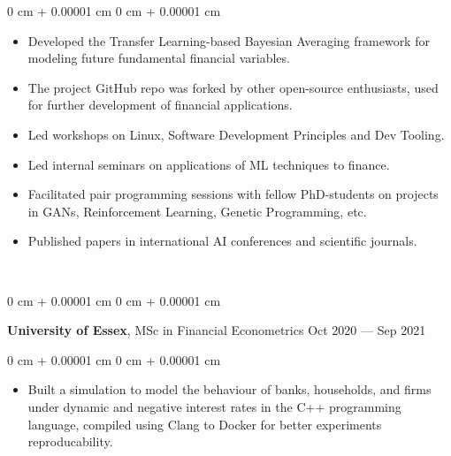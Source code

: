 \documentclass[10pt, letterpaper]{article}
\newenvironment{highlights}{
    \begin{itemize}[
        topsep=0.10 cm,
        parsep=0.10 cm,
        partopsep=0pt,
        itemsep=0pt,
        leftmargin=0 cm + 10pt
    ]
}{
    \end{itemize}
} %
\newenvironment{onecolentry}{
    \begin{adjustwidth}{
        0 cm + 0.00001 cm
    }{
        0 cm + 0.00001 cm
    }
}{
    \end{adjustwidth}
} %
\newenvironment{twocolentry}[2][]{
    \onecolentry
    \def\secondColumn{#2}
    \setcolumnwidth{\fill, 4.5 cm}
    \begin{paracol}{2}
}{
    \switchcolumn \raggedleft \secondColumn
    \end{paracol}
    \endonecolentry
} %
\begin{document}
        \vspace{0.10 cm}
        \begin{onecolentry}
            \begin{highlights}
            \item Developed the Transfer Learning-based Bayesian Averaging framework for modeling future fundamental financial variables.
            \item The project GitHub repo was forked by other open-source enthusiasts, used for further development of financial applications.
                \item Led workshops on Linux, Software Development Principles and Dev Tooling.
                \item Led internal seminars on applications of ML techniques to finance.
                \item Facilitated pair programming sessions with fellow PhD-students on projects in GANs, Reinforcement Learning, Genetic Programming, etc.
                \item Published papers in international AI conferences and scientific journals.
            \end{highlights}
        \end{onecolentry}
        ~
        ~
        \begin{twocolentry}{
            Oct 2020 --- Sep 2021 
        }
            \textbf{University of Essex}, MSc in Financial Econometrics\end{twocolentry}

        \vspace{0.10 cm}
        \begin{onecolentry}
            \begin{highlights}
            \item Built a simulation to model the behaviour of banks, households, and firms under dynamic and negative interest rates in the C++ programming language, compiled using Clang to Docker for better experiments reproducability.
            \end{highlights}
        \end{onecolentry}
\end{document}
